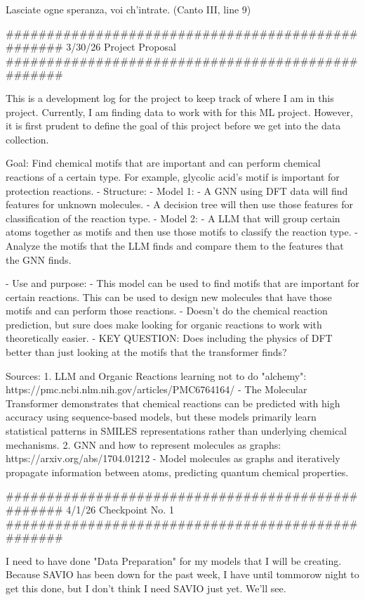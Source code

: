 Lasciate ogne speranza, voi ch'intrate. (Canto III, line 9)

##################################################
3/30/26 Project Proposal
##################################################

This is a development log for the project to keep track of where I am in this project. Currently, I am finding data to work with for this ML project. 
However, it is first prudent to define the goal of this project before we get into the data collection. 

Goal: Find chemical motifs that are important and can perform chemical reactions of a certain type. For example, glycolic acid's motif is important for protection reactions. 
 - Structure: 
    - Model 1: 
        - A GNN using DFT data will find features for unknown molecules. 
        - A decision tree will then use those features for classification of the reaction type. 
    - Model 2: 
        - A LLM that will group certain atoms together as motifs and then use those motifs to classify the reaction type.
        - Analyze the motifs that the LLM finds and compare them to the features that the GNN finds.
    
 - Use and purpose: 
    - This model can be used to find motifs that are important for certain reactions. This can be used to design new molecules that have those motifs and can perform those reactions.
    - Doesn't do the chemical reaction prediction, but sure does make looking for organic reactions to work with theoretically easier.
    - KEY QUESTION: Does including the physics of DFT better than just looking at the motifs that the transformer finds?

Sources: 
    1. LLM and Organic Reactions learning not to do "alchemy": https://pmc.ncbi.nlm.nih.gov/articles/PMC6764164/ 
        - The Molecular Transformer demonstrates that chemical reactions can be predicted with high accuracy using sequence-based models, 
        but these models primarily learn statistical patterns in SMILES representations rather than underlying chemical mechanisms.
    2. GNN and how to represent molecules as graphs: https://arxiv.org/abs/1704.01212
        - Model molecules as graphs and iteratively propagate information between atoms, predicting quantum chemical properties.

##################################################
4/1/26 Checkpoint No. 1
##################################################

I need to have done "Data Preparation" for my models that I will be creating. Because SAVIO has been down for the past week, I have until tommorow night to get this done, 
but I don't think I need SAVIO just yet. We'll see. 

